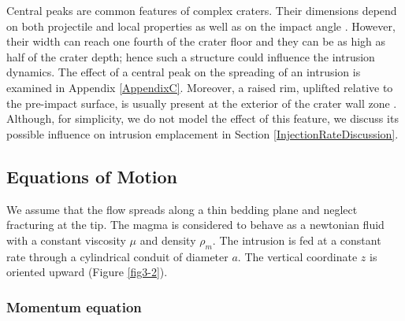 \begin{article}
                  Central  peaks   are  common  features   of  complex
                  craters. Their dimensions  depend on both projectile
                  and local properties as well  as on the impact angle
                  \citep{Schultz1994,BRAY2008a}. However,  their width
                  can reach  one fourth of  the crater floor  and they
                  can be  as high as  half of the crater  depth; hence
                  such  a  structure  could  influence  the  intrusion
                  dynamics.   The  effect of  a  central  peak on  the
                  spreading of  an intrusion  is examined  in Appendix
                  \ref{AppendixC}.  Moreover,  a raised  rim, uplifted
                  relative  to  the  pre-impact  surface,  is  usually
                  present  at the  exterior  of the  crater wall  zone
                  \citep{Pike1976,Pike1980}. Although, for simplicity,
                  we  do not  model  the effect  of  this feature,  we
                  discuss   its   possible  influence   on   intrusion
                  emplacement                in                Section
                  \ref{InjectionRateDiscussion}.
	 		 
                  \subsection{Equations of Motion}
	
                  We assume that the flow spreads along a thin bedding
                  plane and  neglect fracturing at the  tip. The magma
                  is considered to behave as  a newtonian fluid with a
                  constant viscosity $\mu$ and density $\rho_{m}$. The
                  intrusion  is  fed  at  a constant  rate  through  a
                  cylindrical  conduit of  diameter $a$.  The vertical
                  coordinate   $z$   is    oriented   upward   (Figure
                  \ref{fig3-2}).
 	
                  \subsubsection{Momentum equation}
                  \label{Equation_Momentum}
	

\end{article}
